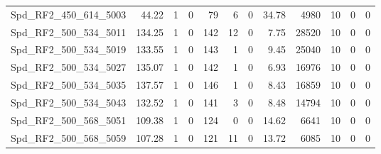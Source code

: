 \begin{longtable}[c]{@{}lrrrrrrrrrrr@{}}
Spd\_RF2\_450\_614\_5003     & 44.22                  & 1                       & 0                       & 79                     & 6                       & 0                       & 34.78                   & 4980                     & 10                       & 0                        & 0                        \\
Spd\_RF2\_500\_534\_5011     & 134.25                 & 1                       & 0                       & 142                    & 12                      & 0                       & 7.75                    & 28520                    & 10                       & 0                        & 0                        \\
Spd\_RF2\_500\_534\_5019     & 133.55                 & 1                       & 0                       & 143                    & 1                       & 0                       & 9.45                    & 25040                    & 10                       & 0                        & 0                        \\
Spd\_RF2\_500\_534\_5027     & 135.07                 & 1                       & 0                       & 142                    & 1                       & 0                       & 6.93                    & 16976                    & 10                       & 0                        & 0                        \\
Spd\_RF2\_500\_534\_5035     & 137.57                 & 1                       & 0                       & 146                    & 1                       & 0                       & 8.43                    & 16859                    & 10                       & 0                        & 0                        \\
Spd\_RF2\_500\_534\_5043     & 132.52                 & 1                       & 0                       & 141                    & 3                       & 0                       & 8.48                    & 14794                    & 10                       & 0                        & 0                        \\
Spd\_RF2\_500\_568\_5051     & 109.38                 & 1                       & 0                       & 124                    & 0                       & 0                       & 14.62                   & 6641                     & 10                       & 0                        & 0                        \\
Spd\_RF2\_500\_568\_5059     & 107.28                 & 1                       & 0                       & 121                    & 11                      & 0                       & 13.72                   & 6085                     & 10                       & 0                        & 0                        \\

\end{longtable}
